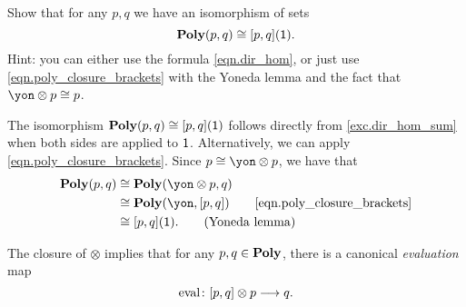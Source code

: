 \documentclass[Book-Poly]{subfiles}
\begin{document}
\begin{exercise}\label{exc.poly_plug_1}
Show that for any $p,q$ we have an isomorphism of sets
\[
\mathbf{Poly}(p,q) \cong [p,q](\textsf{1}).
\]
Hint: you can either use the formula \eqref{eqn.dir_hom}, or just use 
\eqref{eqn.poly_closure_brackets} with the Yoneda lemma and the fact that $\yon\otimes p \iso p$.
\begin{solution}
The isomorphism $\mathbf{Poly}(p,q) \cong [p,q](\textsf{1})$ follows directly from \cref{exc.dir_hom_sum} when both sides are applied to $\textsf{1}$.
Alternatively, we can apply \eqref{eqn.poly_closure_brackets}.
Since $p \iso \yon \otimes p$, we have that
\begin{align*}
    \poly(p, q) &\iso \poly(\yon \otimes p, q) \\
    &\iso \poly(\yon, \ihom{p,q}) \tag*{\eqref{eqn.poly_closure_brackets}} \\
    &\iso \ihom{p,q}(\1). \tag{Yoneda lemma}
\end{align*}
\end{solution}
\end{exercise}

The closure of $\otimes$ implies that for any $p,q\in\mathbf{Poly}$, there is a canonical \emph{evaluation} map
\begin{equation}\label{eqn.eval_dirichlet}
  \mathrm{eval}\colon [p,q]\otimes p\longrightarrow q.
\end{equation}
\end{document}

